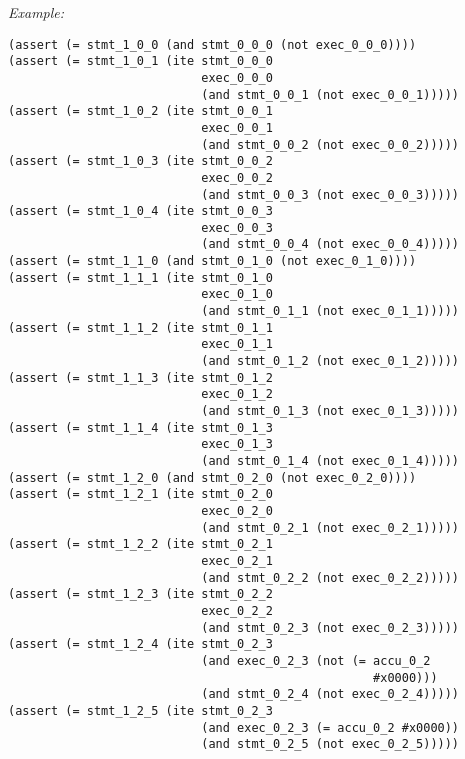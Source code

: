\noindent
\emph{Example:} 

\begin{lstlisting}[style=smtlib]
(assert (= stmt_1_0_0 (and stmt_0_0_0 (not exec_0_0_0))))
(assert (= stmt_1_0_1 (ite stmt_0_0_0
                           exec_0_0_0
                           (and stmt_0_0_1 (not exec_0_0_1)))))
(assert (= stmt_1_0_2 (ite stmt_0_0_1
                           exec_0_0_1
                           (and stmt_0_0_2 (not exec_0_0_2)))))
(assert (= stmt_1_0_3 (ite stmt_0_0_2
                           exec_0_0_2
                           (and stmt_0_0_3 (not exec_0_0_3)))))
(assert (= stmt_1_0_4 (ite stmt_0_0_3
                           exec_0_0_3
                           (and stmt_0_0_4 (not exec_0_0_4)))))
(assert (= stmt_1_1_0 (and stmt_0_1_0 (not exec_0_1_0))))
(assert (= stmt_1_1_1 (ite stmt_0_1_0
                           exec_0_1_0
                           (and stmt_0_1_1 (not exec_0_1_1)))))
(assert (= stmt_1_1_2 (ite stmt_0_1_1
                           exec_0_1_1
                           (and stmt_0_1_2 (not exec_0_1_2)))))
(assert (= stmt_1_1_3 (ite stmt_0_1_2
                           exec_0_1_2
                           (and stmt_0_1_3 (not exec_0_1_3)))))
(assert (= stmt_1_1_4 (ite stmt_0_1_3
                           exec_0_1_3
                           (and stmt_0_1_4 (not exec_0_1_4)))))
(assert (= stmt_1_2_0 (and stmt_0_2_0 (not exec_0_2_0))))
(assert (= stmt_1_2_1 (ite stmt_0_2_0
                           exec_0_2_0
                           (and stmt_0_2_1 (not exec_0_2_1)))))
(assert (= stmt_1_2_2 (ite stmt_0_2_1
                           exec_0_2_1
                           (and stmt_0_2_2 (not exec_0_2_2)))))
(assert (= stmt_1_2_3 (ite stmt_0_2_2
                           exec_0_2_2
                           (and stmt_0_2_3 (not exec_0_2_3)))))
(assert (= stmt_1_2_4 (ite stmt_0_2_3
                           (and exec_0_2_3 (not (= accu_0_2
                                                   #x0000)))
                           (and stmt_0_2_4 (not exec_0_2_4)))))
(assert (= stmt_1_2_5 (ite stmt_0_2_3
                           (and exec_0_2_3 (= accu_0_2 #x0000))
                           (and stmt_0_2_5 (not exec_0_2_5)))))
\end{lstlisting}

